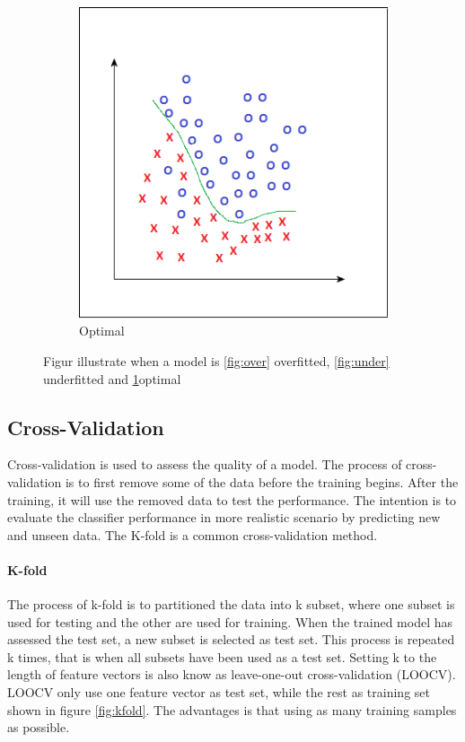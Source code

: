 \documentclass[USenglish]{ifimaster}  %
\begin{document}
\begin{figure}[h]
\begin{subfigure}{\linewidth}
			\includegraphics[scale=0.43]{Figures/Finefitting}
			\caption{Optimal}
			\label{fig:optimal}
		\end{subfigure}
		\caption{Figur illustrate when a model is \ref{fig:over} overfitted, \ref{fig:under} underfitted and \ref{fig:optimal}optimal }
		\label{fig:fitting}	
	\end{figure}
	
	\FloatBarrier
	
\subsection{Cross-Validation}
Cross-validation is used to assess the quality of a model. The process of cross-validation is to first remove some of the data before the training begins. After the training, it will use the removed data to test the performance. The intention is to evaluate the classifier performance in more realistic scenario by predicting new and unseen data. The K-fold is a common cross-validation method.
	
\paragraph{K-fold}
The process of k-fold is to partitioned the data into k subset, where one subset is used for testing and the other are used for training. When the trained model has assessed the test set, a new subset is selected as test set. This process is repeated k times, that is when all subsets have been used as a test set. Setting k to the length of feature vectors is also know as leave-one-out cross-validation (LOOCV). LOOCV only use one feature vector as test set, while the rest as training set shown in figure \ref{fig:kfold}. The advantages is that using as many training samples as possible.
	
\end{document}
